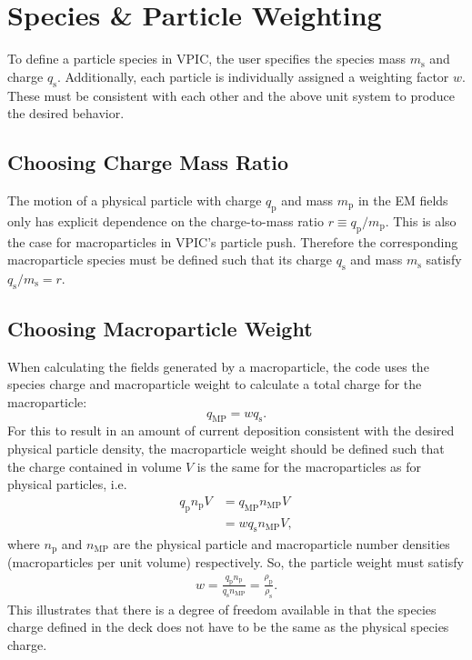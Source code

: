 \documentclass[twocolumn,10pt]{article}
\begin{document}
	\section{Species \& Particle Weighting}

	To define a particle species in VPIC, the user specifies the species mass $m_{\mathrm{s}}$ and charge $q_{\mathrm{s}}$. Additionally, each particle is individually assigned a weighting factor $w$. These must be consistent with each other and the above unit system to produce the desired behavior.

	\subsection{Choosing Charge Mass Ratio}

	The motion of a physical particle with charge $q_{\mathrm{p}}$ and mass $m_{\mathrm{p}}$ in the EM fields only has explicit dependence on the charge-to-mass ratio $r \equiv q_{\mathrm{p}}/m_{\mathrm{p}}$. This is also the case for macroparticles in VPIC's particle push. Therefore the corresponding macroparticle species must be defined such that its charge $q_{\mathrm{s}}$ and mass $m_{\mathrm{s}}$ satisfy $q_{\mathrm{s}}/m_{\mathrm{s}}=r$.

	\subsection{Choosing Macroparticle Weight}
	When calculating the fields generated by a macroparticle, the code uses the species charge and macroparticle weight to calculate a total charge for the macroparticle:
	\begin{equation}
		q_{\mathrm{MP}} = wq_{\mathrm{s}}.
	\end{equation}
	For this to result in an amount of current deposition consistent with the desired physical particle density, the macroparticle weight should be defined such that the charge contained in volume $V$ is the same for the macroparticles as for physical particles, i.e.
	\begin{align*}
		q_{\mathrm{p}}n_{\mathrm{p}}V &= q_{\mathrm{MP}}n_{\mathrm{MP}}V \\
			&= wq_{\mathrm{s}}n_{\mathrm{MP}}V,
	\end{align*}
	where $n_{\mathrm{p}}$ and $n_{\mathrm{MP}}$ are the physical particle and macroparticle number densities (macroparticles per unit volume) respectively. So, the particle weight must satisfy
	\begin{align}
		w = \frac{q_{\mathrm{p}}n_{\mathrm{p}}}{q_{\mathrm{s}}n_{\mathrm{MP}}} = \frac{\rho_{\mathrm{p}}}{\rho_{\mathrm{s}}}.
	\end{align}
	This illustrates that there is a degree of freedom available in that the species charge defined in the deck does not have to be the same as the physical species charge.
\end{document}

